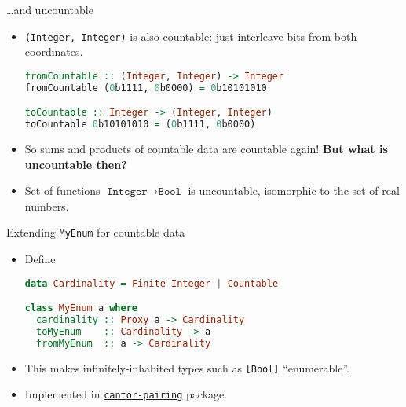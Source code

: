 \documentclass[handout]{beamer}
\begin{document}
\begin{frame}[fragile]{\dots and uncountable}

\begin{itemize}[<+->]

\item
{\tt (Integer, Integer)} is also countable: just interleave bits from both coordinates.

\begin{lstlisting}[language=Haskell]
fromCountable :: (Integer, Integer) -> Integer
fromCountable (0b1111, 0b0000) = 0b10101010

toCountable :: Integer -> (Integer, Integer)
toCountable 0b10101010 = (0b1111, 0b0000)
\end{lstlisting}

\item So sums and products of countable data are countable again!
      {\bf But what is uncountable then?}

\item Set of functions $\texttt{Integer} \to \texttt{Bool}$ is uncountable,
      isomorphic to the set of real numbers.

\end{itemize}

\end{frame}

\begin{frame}[fragile]{Extending {\tt MyEnum} for countable data}

\begin{itemize}[<+->]

\item Define

\begin{lstlisting}[language=Haskell]
data Cardinality = Finite Integer | Countable

class MyEnum a where
  cardinality :: Proxy a -> Cardinality
  toMyEnum    :: Cardinality -> a
  fromMyEnum  :: a -> Cardinality
\end{lstlisting}

\item This makes infinitely-inhabited types such as {\tt [Bool]} ``enumerable''.

\item
Implemented in
\href{http://hackage.haskell.org/package/cantor-pairing}{\tt cantor-pairing} package.

\end{itemize}

\end{frame}

\end{document}
